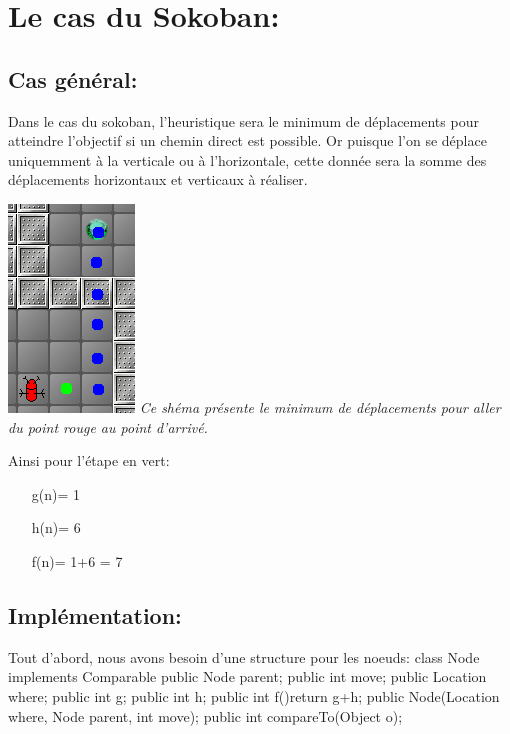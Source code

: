 \documentclass{article}
\begin{document}
\section{Le cas du Sokoban:}
\subsection{Cas général:}
Dans le cas du sokoban, l'heuristique sera le minimum  de déplacements pour atteindre l'objectif si un chemin direct est possible. Or puisque l'on se déplace uniquemment à la verticale ou à l'horizontale, cette donnée sera la somme des déplacements horizontaux et verticaux à réaliser.
\begin{center}
\includegraphics[scale=1]{images/heuristic.png} \newline
\textit{Ce shéma présente le minimum de déplacements pour aller du point rouge au point d'arrivé.}
\end{center}
Ainsi pour l'étape en vert:
\begin{itemize}
\item[g(n)= 1]
\item[h(n)= 6]
\item[f(n)= 1+6 = 7]
\end{itemize}
\subsection{Implémentation:}
Tout d'abord, nous avons besoin d'une structure pour les noeuds: \newpage
class Node implements Comparable {\newline
public Node parent;\newline
public int move;\newline
public Location where;\newline
public int g;\newline
public int h;\newline
public int f(){return g+h;}\newline
public Node(Location where, Node parent, int move);\newline
public int compareTo(Object o);\newline
}\newline
\end{document}
